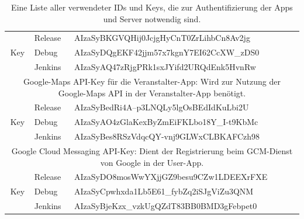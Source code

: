 \begin{table}[htb]
\begin{tabular}{|c|l|l|}
		\multirow{3}{3mm}{\begin{sideways}Key\end{sideways}} & Release & AIzaSyBKGVQHij0JcjgHyCnT0ZrLihbCn8Av2jg \\
		\cline{2-3}
		& Debug & AIzaSyDQgEKF42jjm57x7kgnY7EI62CcXW\_zDS0 \\
		\cline{2-3}
		& Jenkins & AIzaSyAQ47zRjgPRk1sxJYifd2URQdEnk5HvnRw \\
		\hline
		\hline
		\multicolumn{3}{|p{15cm}|}{
			Google-Maps API-Key für die Veranstalter-App: Wird zur Nutzung der Google-Maps API in der Veranstalter-App benötigt.
		} \\
		\hline
		\multirow{3}{3mm}{\begin{sideways}Key\end{sideways}} & Release & AIzaSyBedRi4A--p3LNQLy5lgOsBEdIdKuLbi2U \\
		\cline{2-3}
		& Debug & AIzaSyAO4zGlaKexByZmEiFKLbo18Y\_I-t9KbMc \\
		\cline{2-3}
		& Jenkins & AIzaSyBes8RSzVdqcQY-vnj9GLWxCLBKAFCzh98 \\
		\hline
		\hline
		\multicolumn{3}{|p{15cm}|}{
			Google Cloud Messaging API-Key: Dient der Registrierung beim GCM-Dienst von Google in der User-App.
		} \\
		\hline
		\multirow{3}{3mm}{\begin{sideways}Key\end{sideways}} & Release & AIzaSyDO8mosWwYXjjGZ9besu9CZw1LDEEXrFXE \\
		\cline{2-3}
		& Debug & AIzaSyCpwhxda1Lb5E61\_fybZq2iSJgViZu3QNM \\
		\cline{2-3}
		& Jenkins & AIzaSyBjeKzx\_vzkUgQZdT83BB0BMD3gFebpet0 \\
		\hline
	\end{tabular}
	\caption{Eine Liste aller verwendeter IDs und Keys, die zur Authentifizierung der Apps und Server notwendig sind.}
	\label{tab:keys}
\end{table}

